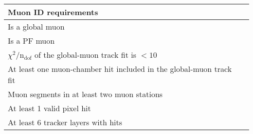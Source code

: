 \begin{table}
\noindent \centering{}
\label{tab:mu_tight_id}
\begin{tabular}{ll}
\hline
Muon ID requirements\\
\hline 
Is a global muon\\
Is a PF muon\\
$\chi^{2}/\mathrm{n_{dof}}$ of the global-muon track fit is $<10$\\
At least one muon-chamber hit included in the global-muon track fit\\
Muon segments in at least two muon stations\\
At least 1 valid pixel hit\\
At least 6 tracker layers with hits\\
\hline
\end{tabular}
\end{table}